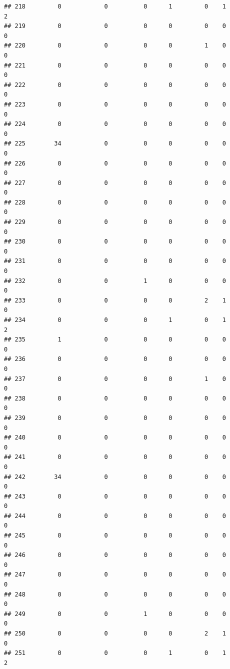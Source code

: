 \documentclass[
]{article}
\begin{document}
\begin{verbatim}
## 218         0            0          0      1         0    1              2
## 219         0            0          0      0         0    0              0
## 220         0            0          0      0         1    0              0
## 221         0            0          0      0         0    0              0
## 222         0            0          0      0         0    0              0
## 223         0            0          0      0         0    0              0
## 224         0            0          0      0         0    0              0
## 225        34            0          0      0         0    0              0
## 226         0            0          0      0         0    0              0
## 227         0            0          0      0         0    0              0
## 228         0            0          0      0         0    0              0
## 229         0            0          0      0         0    0              0
## 230         0            0          0      0         0    0              0
## 231         0            0          0      0         0    0              0
## 232         0            0          1      0         0    0              0
## 233         0            0          0      0         2    1              0
## 234         0            0          0      1         0    1              2
## 235         1            0          0      0         0    0              0
## 236         0            0          0      0         0    0              0
## 237         0            0          0      0         1    0              0
## 238         0            0          0      0         0    0              0
## 239         0            0          0      0         0    0              0
## 240         0            0          0      0         0    0              0
## 241         0            0          0      0         0    0              0
## 242        34            0          0      0         0    0              0
## 243         0            0          0      0         0    0              0
## 244         0            0          0      0         0    0              0
## 245         0            0          0      0         0    0              0
## 246         0            0          0      0         0    0              0
## 247         0            0          0      0         0    0              0
## 248         0            0          0      0         0    0              0
## 249         0            0          1      0         0    0              0
## 250         0            0          0      0         2    1              0
## 251         0            0          0      1         0    1              2

\end{verbatim}
\end{document}
